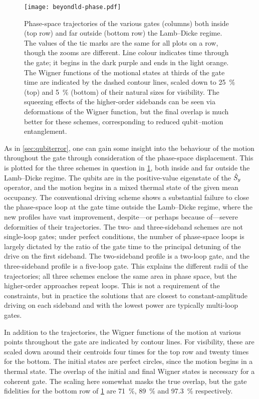 \begin{figure}
    \texttt{[image: beyondld-phase.pdf]}
    \caption[Phase-space paths of the strongly coupled M\o lmer--S\o rensen gate]{\label{fig:beyondld-phasespace}%
        Phase-space trajectories of the various gates (columns) both inside (top row) and far outside (bottom row) the Lamb--Dicke regime.
        The values of the tic marks are the same for all plots on a row, though the zooms are different.
        Line colour indicates time through the gate; it begins in the dark purple and ends in the light orange.
        The Wigner functions of the motional states at thirds of the gate time are indicated by the dashed contour lines, scaled down to \qty{25}{\percent} (top) and \qty{5}{\percent} (bottom) of their natural sizes for visibility.
        The squeezing effects of the higher-order sidebands can be seen via deformations of the Wigner function, but the final overlap is much better for these schemes, corresponding to reduced qubit--motion entanglement.
    }
\end{figure}

As in \cref{sec:qubiterror}, one can gain some insight into the behaviour of the motion throughout the gate through consideration of the phase-space displacement.
This is plotted for the three schemes in question in \cref{fig:beyondld-phasespace}, both inside and far outside the Lamb--Dicke regime.
The qubits are in the positive-value eigenstate of the $\hat{S}_y$ operator, and the motion begins in a mixed thermal state of the given mean occupancy.
The conventional driving scheme shows a substantial failure to close the phase-space loop at the gate time outside the Lamb--Dicke regime, where the new profiles have vast improvement, despite---or perhaps because of---severe deformities of their trajectories.
The two- and three-sideband schemes are not single-loop gates; under perfect conditions, the number of phase-space loops is largely dictated by the ratio of the gate time to the principal detuning of the drive on the first sideband.
The two-sideband profile is a two-loop gate, and the three-sideband profile is a five-loop gate.
This explains the different radii of the trajectories; all three schemes enclose the same area in phase space, but the higher-order approaches repeat loops.
This is not a requirement of the constraints, but in practice the solutions that are closest to constant-amplitude driving on each sideband and with the lowest power are typically multi-loop gates.

In addition to the trajectories, the Wigner functions of the motion at various points throughout the gate are indicated by contour lines.
For visibility, these are scaled down around their centroids four times for the top row and twenty times for the bottom.
The initial states are perfect circles, since the motion begins in a thermal state.
The overlap of the initial and final Wigner states is necessary for a coherent gate.
The scaling here somewhat masks the true overlap, but the gate fidelities for the bottom row of \cref{fig:beyondld-phasespace} are \qty{71}{\percent}, \qty{89}{\percent} and \qty{97.3}{\percent} respectively.

